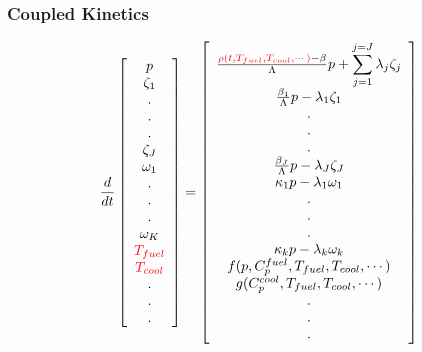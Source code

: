 \begin{frame}[fragile]
  \frametitle{Coupled Kinetics}
  \footnotesize{
\begin{equation} 
  \frac{d}{dt}\left[
    \begin{array}{c}
      p\\
      \zeta_1\\
      .\\
      .\\
      .\\
      \zeta_J\\
      \omega_1\\
      .\\
      .\\
      .\\
      \omega_K\\
      \textcolor{red}{T_{fuel}}\\
      \textcolor{red}{T_{cool}}\\
      .\\
      .\\
      .\\
    \end{array}
    \right]
    =
    \left[
      \begin{array}{ c }
        \frac{\textcolor{red}{\rho(t,T_{fuel},T_{cool},\cdots)}-\beta}{\Lambda}p + 
        \displaystyle\sum^{j=J}_{j=1}\lambda_j\zeta_j\\
        \frac{\beta_1}{\Lambda} p - \lambda_1\zeta_1\\
        .\\
        .\\
        .\\
        \frac{\beta_J}{\Lambda}p-\lambda_J\zeta_J\\
        \kappa_1p - \lambda_1\omega_1\\
        .\\
        .\\
        .\\
        \kappa_{k} p - \lambda_k\omega_{k}\\
        f(p, C_p^{fuel}, T_{fuel}, T_{cool},\cdots)\\
        g(C_p^{cool}, T_{fuel}, T_{cool},\cdots)\\
        .\\
        .\\
        .\\
      \end{array}
      \right]
      \label{eqn:note_rho_prke}
    \end{equation}
  
  }
\end{frame}

